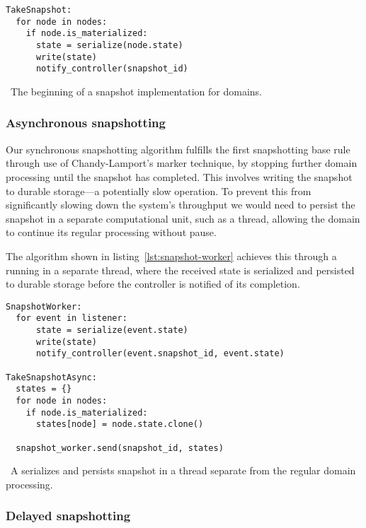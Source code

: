 \begin{listing}[H]
  \begin{verbatim}
TakeSnapshot:
  for node in nodes:
    if node.is_materialized:
      state = serialize(node.state)
      write(state)
      notify_controller(snapshot_id)
  \end{verbatim}
  \caption{\
    The beginning of a snapshot implementation for domains.
  }\label{lst:naive}
\end{listing}


\subsubsection{Asynchronous snapshotting}\label{sec:async-snapshot}

Our synchronous snapshotting algorithm fulfills the first snapshotting base rule
through use of Chandy-Lamport's marker technique, by stopping further domain
processing until the snapshot has completed. This involves writing the snapshot
to durable storage---a potentially slow operation. To prevent this from
significantly slowing down the system's throughput we would need to persist the
snapshot in a separate computational unit, such as a thread, allowing the
domain to continue its regular processing without pause.

The algorithm shown in listing~\ref{lst:snapshot-worker} achieves this through a
\code{SnapshotWorker} running in a separate thread, where the received state is
serialized and persisted to durable storage before the controller is notified of
its completion.

\begin{listing}[H]
  \begin{verbatim}
SnapshotWorker:
  for event in listener:
      state = serialize(event.state)
      write(state)
      notify_controller(event.snapshot_id, event.state)

TakeSnapshotAsync:
  states = {}
  for node in nodes:
    if node.is_materialized:
      states[node] = node.state.clone()

  snapshot_worker.send(snapshot_id, states)
  \end{verbatim}
  \caption{\
    A  serializes and persists snapshot in a thread
    separate from the regular domain processing.
  }\label{lst:snapshot-worker}
\end{listing}

\subsubsection{Delayed snapshotting}

